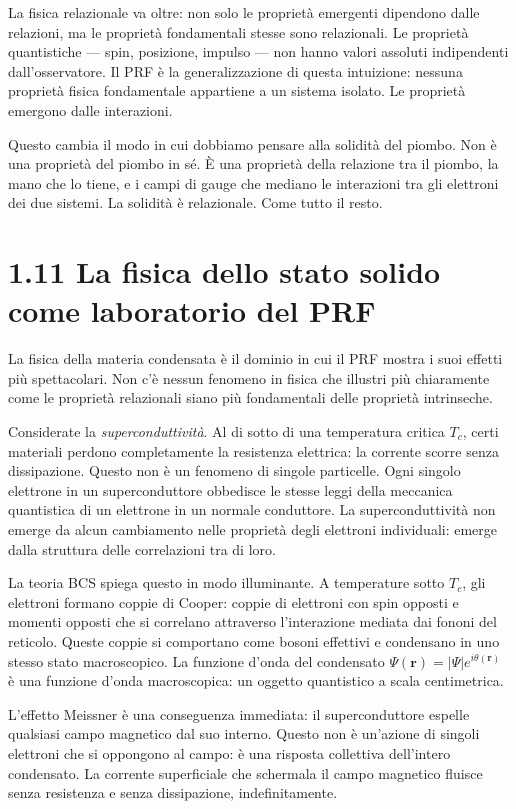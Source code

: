 \documentclass[11.5pt,a4paper,openany]{book}
\theoremstyle{remark}
\begin{document}
La fisica relazionale va oltre: non solo le proprietà emergenti dipendono dalle relazioni, ma le proprietà fondamentali stesse sono relazionali. Le proprietà quantistiche --- spin, posizione, impulso --- non hanno valori assoluti indipendenti dall'osservatore. Il PRF è la generalizzazione di questa intuizione: nessuna proprietà fisica fondamentale appartiene a un sistema isolato. Le proprietà emergono dalle interazioni.

Questo cambia il modo in cui dobbiamo pensare alla solidità del piombo. Non è una proprietà del piombo in sé. È una proprietà della relazione tra il piombo, la mano che lo tiene, e i campi di gauge che mediano le interazioni tra gli elettroni dei due sistemi. La solidità è relazionale. Come tutto il resto.

\section{1.11 La fisica dello stato solido come laboratorio del PRF}

La fisica della materia condensata è il dominio in cui il PRF mostra i suoi effetti più spettacolari. Non c'è nessun fenomeno in fisica che illustri più chiaramente come le proprietà relazionali siano più fondamentali delle proprietà intrinseche.

Considerate la \textit{superconduttività}. Al di sotto di una temperatura critica $T_c$, certi materiali perdono completamente la resistenza elettrica: la corrente scorre senza dissipazione. Questo non è un fenomeno di singole particelle. Ogni singolo elettrone in un superconduttore obbedisce le stesse leggi della meccanica quantistica di un elettrone in un normale conduttore. La superconduttività non emerge da alcun cambiamento nelle proprietà degli elettroni individuali: emerge dalla struttura delle correlazioni tra di loro.

La teoria BCS spiega questo in modo illuminante. A temperature sotto $T_c$, gli elettroni formano coppie di Cooper: coppie di elettroni con spin opposti e momenti opposti che si correlano attraverso l'interazione mediata dai fononi del reticolo. Queste coppie si comportano come bosoni effettivi e condensano in uno stesso stato macroscopico. La funzione d'onda del condensato $\Psi(\mathbf{r}) = |\Psi|e^{i\theta(\mathbf{r})}$ è una funzione d'onda macroscopica: un oggetto quantistico a scala centimetrica.

L'effetto Meissner è una conseguenza immediata: il superconduttore espelle qualsiasi campo magnetico dal suo interno. Questo non è un'azione di singoli elettroni che si oppongono al campo: è una risposta collettiva dell'intero condensato. La corrente superficiale che schermala il campo magnetico fluisce senza resistenza e senza dissipazione, indefinitamente.
\end{document}
